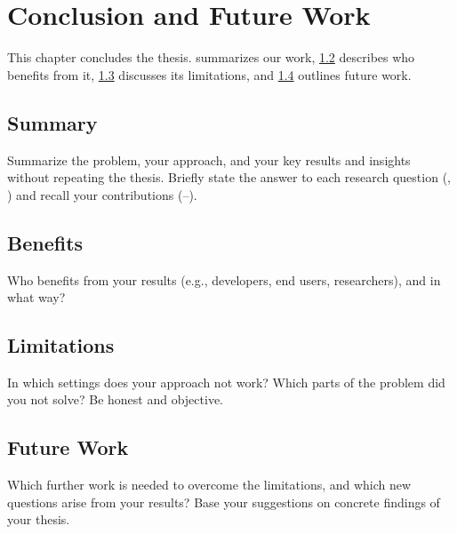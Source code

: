 \chapter{Conclusion and Future Work}\label{chap:conclusion}

This chapter concludes the thesis.
 summarizes our work, \cref{sec:conclusion:benefits} describes who benefits from it, \cref{sec:conclusion:limitations} discusses its limitations, and \cref{sec:conclusion:future-work} outlines future work.

\section{Summary}\label{sec:conclusion:summary}

Summarize the problem, your approach, and your key results and insights without repeating the thesis.
Briefly state the answer to each research question (, ) and recall your contributions (--).

\section{Benefits}\label{sec:conclusion:benefits}

Who benefits from your results (e.g., developers, end users, researchers), and in what way?

\section{Limitations}\label{sec:conclusion:limitations}

In which settings does your approach not work?
Which parts of the problem did you not solve?
Be honest and objective.

\section{Future Work}\label{sec:conclusion:future-work}

Which further work is needed to overcome the limitations, and which new questions arise from your results?
Base your suggestions on concrete findings of your thesis.
